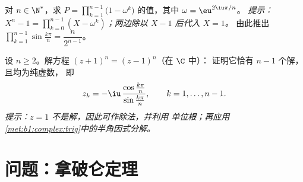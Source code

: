 \begin{exercise}[$\star\star\star$]\label{exo:b1:complex:11}
对 $n \in \N^*$，求 $P = \prod_{k=1}^{n-1}
\bigl(1 - \omega^k\bigr)$ 的值，其中 $\omega = \eu^{2\iu\pi/n}$。
\emph{提示：$X^n - 1 = \prod_{k=0}^{n-1} (X - \omega^k)$；两边除以
$X - 1$ 后代入 $X = 1$。} 由此推出
$\prod_{k=1}^{n-1} \sin\frac{k\pi}{n} = \dfrac{n}{2^{n-1}}$。
\end{exercise}

\begin{exercise}[$\star\star$]\label{exo:b1:complex:12}
设 $n \geq 2$。解方程 $(z + 1)^n = (z - 1)^n$（在 $\C$ 中）：
证明它恰有 $n - 1$ 个解，且均为纯虚数，
即
\[
z_k = -\iu\,\frac{\cos\frac{k\pi}{n}}{\sin\frac{k\pi}{n}},
\qquad k = 1, \dots, n - 1 .
\]
\emph{提示：$z = 1$ 不是解，因此可作除法，并利用
单位根；再应用
\cref{met:b1:complex:trig}中的半角因式分解。}
\end{exercise}

\section{问题：拿破仑定理}

